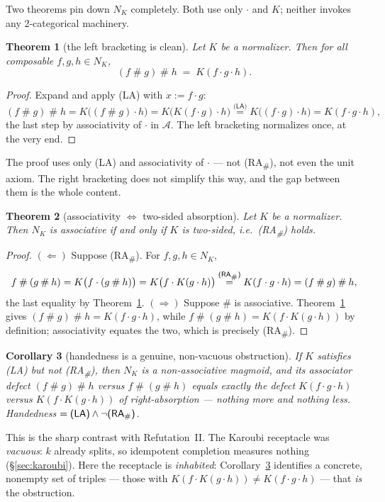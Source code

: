 \documentclass[11pt]{amsart}
\theoremstyle{plain}
\newtheorem{theorem}{Theorem}[section]
\newtheorem{corollary}[theorem]{Corollary}
\theoremstyle{definition}
\theoremstyle{remark}
\newcommand{\sh}{\mathbin{\#}}
\newcommand{\LA}{\textsf{(LA)}}
\newcommand{\RA}{\textsf{(RA}\textsubscript{\#}\textsf{)}}
\begin{document}
Two theorems pin down $N_{K}$ completely. Both use only $\cdot$ and $K$; neither invokes any
2-categorical machinery.

\begin{theorem}[the left bracketing is clean]
\label{thm:A}
Let $K$ be a normalizer. Then for all composable $f,g,h\in N_{K}$,
\[
  (f\sh g)\sh h \;=\; K(f\cdot g\cdot h).
\]
\end{theorem}
\begin{proof}
Expand and apply \LA{} with $x:=f\cdot g$:
\[
  (f\sh g)\sh h = K\big((f\sh g)\cdot h\big) = K\big(K(f\cdot g)\cdot h\big)
     \overset{\LA}{=} K\big((f\cdot g)\cdot h\big) = K(f\cdot g\cdot h),
\]
the last step by associativity of $\cdot$ in $\mathcal{A}$. The left bracketing normalizes once, at
the very end.
\end{proof}

The proof uses only \LA{} and associativity of $\cdot$ --- not \RA{}, not even the unit axiom. The
right bracketing does not simplify this way, and the gap between them is the whole content.

\begin{theorem}[associativity $\Longleftrightarrow$ two-sided absorption]
\label{thm:B}
Let $K$ be a normalizer. Then $N_{K}$ is associative \emph{if and only if} $K$ is two-sided, i.e.\
\RA{} holds.
\end{theorem}
\begin{proof}
$(\Leftarrow)$ Suppose \RA{}. For $f,g,h\in N_{K}$,
\[
  f\sh(g\sh h) = K\big(f\cdot(g\sh h)\big) = K\big(f\cdot K(g\cdot h)\big)
     \overset{\RA}{=} K(f\cdot g\cdot h) = (f\sh g)\sh h,
\]
the last equality by Theorem~\ref{thm:A}.
$(\Rightarrow)$ Suppose $\sh$ is associative. Theorem~\ref{thm:A} gives $(f\sh g)\sh
h=K(f\cdot g\cdot h)$, while $f\sh(g\sh h)=K(f\cdot K(g\cdot h))$ by definition; associativity equates
the two, which is precisely \RA{}.
\end{proof}

\begin{corollary}[handedness is a genuine, non-vacuous obstruction]
\label{cor:genuine}
If $K$ satisfies \LA{} but not \RA{}, then $N_{K}$ is a \emph{non-associative} magmoid, and its
associator defect $(f\sh g)\sh h$ versus $f\sh(g\sh h)$ equals exactly the defect $K(f\cdot g\cdot h)$
versus $K(f\cdot K(g\cdot h))$ of right-absorption --- nothing more and nothing less. Handedness
$=\LA\wedge\neg\RA$.
\end{corollary}

This is the sharp contrast with Refutation~II. The Karoubi receptacle was \emph{vacuous}: $k$ already
splits, so idempotent completion measures nothing (\S\ref{sec:karoubi}). Here the receptacle is
\emph{inhabited}: Corollary~\ref{cor:genuine} identifies a concrete, nonempty set of triples --- those
with $K(f\cdot K(g\cdot h))\ne K(f\cdot g\cdot h)$ --- that \emph{is} the obstruction.
\end{document}
